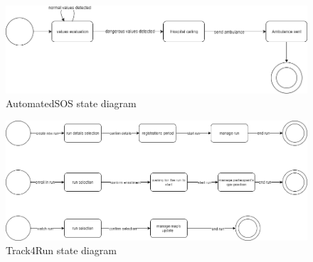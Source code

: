   
  \begin{figure}[H]
    \includegraphics[width=\linewidth]{./Images/Automated_SOS_state_diagram.png}
    \centering
    \caption{AutomatedSOS state diagram}
  \end{figure}


 \begin{figure}[H]
    \includegraphics[width=\linewidth]{./Images/Track4Run_state_diagram.png}
    \centering
    \caption{Track4Run state diagram}
  \end{figure}

